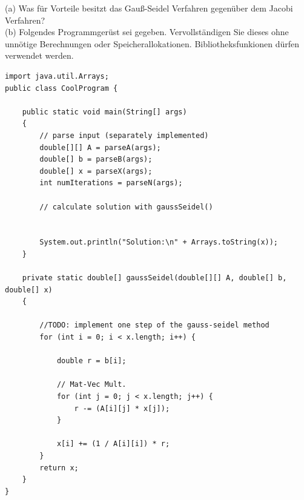 \documentclass{scrartcl}
\begin{document}
(a) 
Was für Vorteile besitzt das Gauß-Seidel Verfahren gegenüber dem Jacobi Verfahren?
\lbreak
\\
(b)
Folgendes Programmgerüst sei gegeben. Vervollständigen Sie dieses ohne unnötige Berechnungen oder Speicherallokationen. Bibliotheksfunkionen dürfen  verwendet werden.
\begin{lstlisting}
import java.util.Arrays;
public class CoolProgram {
	
	public static void main(String[] args) 
	{
		// parse input (separately implemented)
		double[][] A = parseA(args); 
		double[] b = parseB(args);
		double[] x = parseX(args);
		int numIterations = parseN(args);
		
		// calculate solution with gaussSeidel()
		
		
		System.out.println("Solution:\n" + Arrays.toString(x));
	}
	
	private static double[] gaussSeidel(double[][] A, double[] b, double[] x) 
	{
		
		//TODO: implement one step of the gauss-seidel method
		for (int i = 0; i < x.length; i++) {
		
			double r = b[i];
			
			// Mat-Vec Mult.
			for (int j = 0; j < x.length; j++) {
				r -= (A[i][j] * x[j]);
			}
		
			x[i] += (1 / A[i][i]) * r;
		}
		return x;
	}
}
\end{lstlisting}
\end{document}
